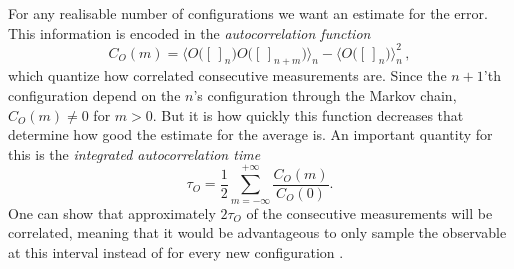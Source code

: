 For any realisable number of configurations we want an estimate for the error.
This information is encoded in the \emph{autocorrelation function}
%
\begin{equation}
  C_{O}(m) = \big\langle O\big([\,]_n\big) O\big([\,]_{n+m}\big)\big\rangle_n
    - \big\langle O\big([\,]_n\big)\big\rangle_n^2\,,
\end{equation}
%
which quantize how correlated consecutive measurements are. Since the $n+1$'th
configuration depend on the $n$'s configuration through the Markov chain,
$C_O(m) \neq 0$ for $m > 0$. But it is how quickly this function decreases that
determine how good the estimate for the average is. An important quantity for
this is the \emph{integrated autocorrelation time}
%
\begin{equation}
  \tau_O = \frac{1}{2} \sum_{m=-\infty}^{+\infty} \frac{C_O(m)}{C_O(0)}.
\end{equation}
%
One can show that approximately $2 \tau_O$ of the consecutive measurements will
be correlated, meaning that it would be advantageous to only sample the
observable at this interval instead of for every new configuration
\citep[sect. 7.1.3]{montvay1997quantum}.
